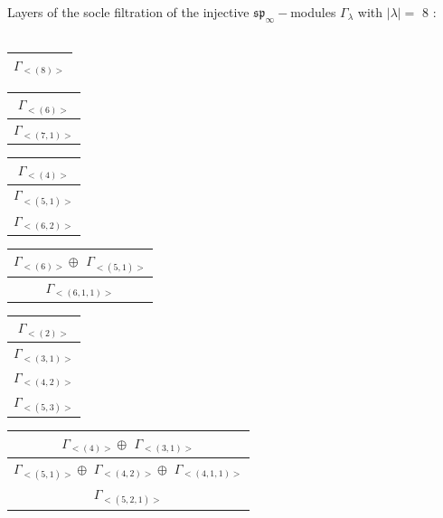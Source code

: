 \bigskip
Layers of the socle filtration of the injective $\mathfrak{sp}_\infty-$modules $\Gamma_{\lambda}$ with $|\lambda| = $ 8 : \\\\
\begin{minipage}{.2\textwidth}
\centering
\begin{tabular}{|c|}\hline
$\Gamma_{<(
8
)>}$
\\
\hline\end{tabular}\end{minipage}
\begin{minipage}{.2\textwidth}
\centering
\begin{tabular}{|c|}\hline
$\Gamma_{<(
6
)>}$
\\ \hline
$\Gamma_{<(
7 , 
1
)>}$
\\
\hline\end{tabular}\end{minipage}
\begin{minipage}{.2\textwidth}
\centering
\begin{tabular}{|c|}\hline
$\Gamma_{<(
4
)>}$
\\ \hline
$\Gamma_{<(
5 , 
1
)>}$
\\ \hline
$\Gamma_{<(
6 , 
2
)>}$
\\
\hline\end{tabular}\end{minipage}
\begin{minipage}{.2\textwidth}
\centering
\begin{tabular}{|c|}\hline
$\Gamma_{<(
6
)>} \oplus$
$\Gamma_{<(
5 , 
1
)>}$
\\ \hline
$\Gamma_{<(
6 , 
1 , 
1
)>}$
\\
\hline\end{tabular}\end{minipage}
\begin{minipage}{.2\textwidth}
\centering
\begin{tabular}{|c|}\hline
$\Gamma_{<(
2
)>}$
\\ \hline
$\Gamma_{<(
3 , 
1
)>}$
\\ \hline
$\Gamma_{<(
4 , 
2
)>}$
\\ \hline
$\Gamma_{<(
5 , 
3
)>}$
\\
\hline\end{tabular}\end{minipage}
\bigskip
\begin{minipage}{.4\textwidth}
\centering
\begin{tabular}{|c|}\hline
$\Gamma_{<(
4
)>} \oplus$
$\Gamma_{<(
3 , 
1
)>}$
\\ \hline
$\Gamma_{<(
5 , 
1
)>} \oplus$
$\Gamma_{<(
4 , 
2
)>} \oplus$
$\Gamma_{<(
4 , 
1 , 
1
)>}$
\\ \hline
$\Gamma_{<(
5 , 
2 , 
1
)>}$
\\
\hline\end{tabular}\end{minipage}

